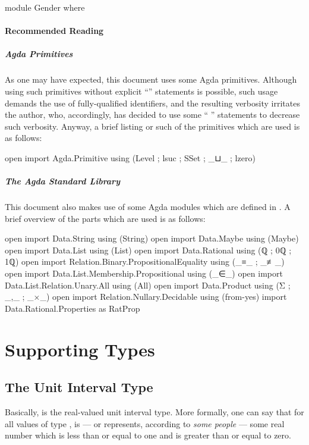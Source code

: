 \documentclass{article}
\theoremstyle{remark}
\begin{document}
\begin{code}
module Gender where
\end{code}

\paragraph{Recommended Reading}

\subparagraph{Agda Primitives}
As one may have expected, this document uses some Agda primitives.  Although using such primitives without explicit ``'' statements is possible, such usage demands the use of fully-qualified identifiers, and the resulting verbosity irritates the author, who, accordingly, has decided to use some `` '' statements to decrease such verbosity.  Anyway, a brief listing or such of the primitives which are used is as follows:

\begin{code}
open import Agda.Primitive using (Level ; lsuc ; SSet ; _⊔_ ; lzero)
\end{code}

\subparagraph{The Agda Standard Library}
This document also makes use of some Agda modules which are defined in \textcite{agdaStdlib}.  A brief overview of the parts which are used is as follows:

\begin{code}
open import Data.String using (String)
open import Data.Maybe using (Maybe)
open import Data.List using (List)
open import Data.Rational using (ℚ ; 0ℚ ; 1ℚ)
open import Relation.Binary.PropositionalEquality using (_≡_ ; _≢_)
open import Data.List.Membership.Propositional using (_∈_)
open import Data.List.Relation.Unary.All using (All)
open import Data.Product using (Σ ; _,_ ; _×_)
open import Relation.Nullary.Decidable using (from-yes)
import Data.Rational.Properties as RatProp
\end{code}

\section{Supporting Types}

\subsection{The Unit Interval Type}
Basically,  is the real-valued unit interval type.  More formally, one can say that for all values  of type ,  is --- or represents, according to \emph{some people} --- some real number which is less than or equal to one and is greater than or equal to zero.
\end{document}
